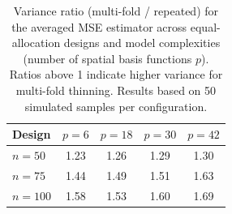 \begin{table}[ht]
\centering
\begin{tabular}{lcccc}
  \toprule
Design & $p=6$ & $p=18$ & $p=30$ & $p=42$ \\ 
  \midrule
$n=50$ & 1.23 & 1.26 & 1.29 & 1.30 \\ 
  $n=75$ & 1.44 & 1.49 & 1.51 & 1.63 \\ 
  $n=100$ & 1.58 & 1.53 & 1.60 & 1.69 \\ 
   \bottomrule
\end{tabular}
\caption{Variance ratio (multi-fold / repeated) for the averaged MSE estimator across equal-allocation designs and model complexities (number of spatial basis functions $p$). Ratios above 1 indicate higher variance for multi-fold thinning. Results based on 50 simulated samples per configuration.} 
\label{tab:multifold}
\end{table}
